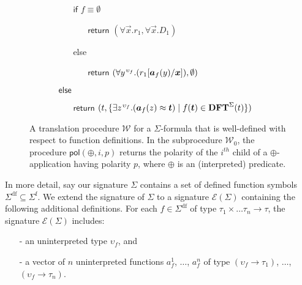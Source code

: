 \documentclass[runningheads,a4paper]{llncs}
\newcommand{\con}[1]{\mathsf{#1}}
\newcommand{\teq}{\approx}
\newcommand{\functerms}{\mathbf{DFT}}
\newcommand{\conv}{\mathcal{W}}
\newcommand{\sfuns}[1]{#1^\mathrm{f}}
\newcommand{\sfundefs}[1]{#1^\mathrm{df}}
\newcommand{\pol}{\con{pol}}
\newcommand{\boolop}{\oplus}
\newcommand{\fnull}{\emptyset}
\newcommand{\farg}[1]{a_{#1}}
\newcommand{\vecfarg}[1]{\vec{a}_{#1}}
\newcommand{\fargsort}[1]{\upsilon_{#1}}
\newcommand{\extendsig}[1]{\mathcal{E}( #1 )}
\newcommand{\vthinspace}{\kern+0.083333em}
\newcommand{\typ}[1]{^{\vthinspace #1}}
\begin{document}
\begin{figure}[t]
\begin{enumerate}
\begin{itemize}
\begin{itemize}
      \item[] $\mathsf{if}$ $f \equiv \fnull$
      \begin{itemize}
        \item[] $\mathsf{return}$ $( \forall \vec x. r_1, \forall \vec x. D_1 )$
      \end{itemize}
      \item[] else
      \begin{itemize}
        \item[] $\mathsf{return}$ $( \forall y\typ{\fargsort{f}}. ( r_1 [ \vecfarg{f}( y ) / \vec x ] ), \emptyset )$
      \end{itemize}
    \end{itemize}
   \item[] $\mathsf{else}$
   \begin{itemize}
     \item[] $\mathsf{return}$ $( t, \{ \exists z\typ{\fargsort{f}}. ( \vecfarg{f}( z ) \teq \vec t ) \mid f( \vec t ) \in \functerms^\Sigma( t ) \} )$
   \end{itemize}
 \end{itemize}
\end{enumerate}
\vspace{-2ex}
\caption{A translation procedure $\conv$ for a $\Sigma$-formula that is well-defined with respect to function definitions.
In the subprocedure $\conv_0$, the procedure $\pol( \boolop, i, p )$ returns the polarity of the $i^{th}$ child of a $\boolop$-application having polarity $p$,
where $\boolop$ is an (interpreted) predicate.
}
\label{fig:encoding}
\end{figure}

In more detail, 
say our signature $\Sigma$ contains a set of defined function symbols $\sfundefs{\Sigma} \subseteq \sfuns{\Sigma}$.
We extend the signature of $\Sigma$ to a signature $\extendsig{\Sigma}$ containing the following additional definitions.
For each $f \in \sfundefs{\Sigma}$ of type $\tau_1 \times \ldots \tau_n \rightarrow \tau$, 
the signature $\extendsig{\Sigma}$ includes:
\begin{enumerate}
\item[-] an uninterpreted type $\fargsort{f}$, and
\item[-] a vector of $n$ uninterpreted functions $\farg{f}^1$, $\ldots$, $\farg{f}^n$ of type $(\fargsort{f} \rightarrow \tau_1)$, $\ldots$, $(\fargsort{f} \rightarrow \tau_n)$.
\end{enumerate}
\end{document}
